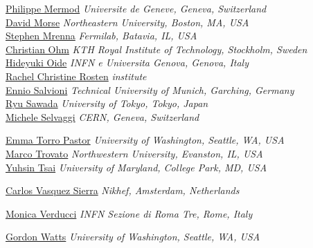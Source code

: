 \noindent\href{mailto:philippe.mermod@cern.ch}{Philippe Mermod}
\emph{Universite de Geneve, Geneva, Switzerland}\\

\noindent\href{mailto:david.michael.morse@cern.ch}{David Morse}
\emph{Northeastern University, Boston, MA, USA}\\

\noindent\href{mailto:mrenna@fnal.gov}{Stephen Mrenna}
\emph{Fermilab, Batavia, IL, USA}\\

\noindent\href{mailto:christian.ohm@cern.ch}{Christian Ohm}
\emph{KTH Royal Institute of Technology, Stockholm, Sweden}\\

\noindent\href{mailto:hideyuki.oide@cern.ch}{Hideyuki Oide}
\emph{INFN e Universita Genova, Genova, Italy}\\

\noindent\href{mailto:rachel.rosten@cern.ch}{Rachel Christine Rosten}
\emph{institute}\\

\noindent\href{mailto:ennio.salvioni@tum.de}{Ennio Salvioni}
\emph{Technical University of Munich, Garching, Germany}\\

\noindent\href{mailto:ryu.sawada@cern.ch}{Ryu Sawada}
\emph{University of Tokyo, Tokyo, Japan}\\

\noindent\href{mailto:Michele.Selvaggi@cern.ch}{Michele Selvaggi}
\emph{CERN, Geneva, Switzerland}

\noindent\href{mailto:emma.torro.pastor@cern.ch}{Emma Torro Pastor}
\emph{University of Washington, Seattle, WA, USA}\\

\noindent\href{mailto:marco.trovato@northwestern.edu}{Marco Trovato}
\emph{Northwestern University, Evanston, IL, USA}\\

\noindent\href{mailto:yhtsai@ucdavis.edu}{Yuhsin Tsai}
\emph{University of Maryland, College Park, MD, USA}

\noindent\href{mailto:carlos.vazquez@cern.ch}{Carlos Vasquez Sierra}
\emph{Nikhef, Amsterdam, Netherlands}

\noindent\href{mailto:monica.verducci@cern.ch}{Monica Verducci}
\emph{INFN Sezione di Roma Tre, Rome, Italy}

\noindent\href{mailto:gwatts@uw.edu}{Gordon Watts}
\emph{University of Washington, Seattle, WA, USA}\\







